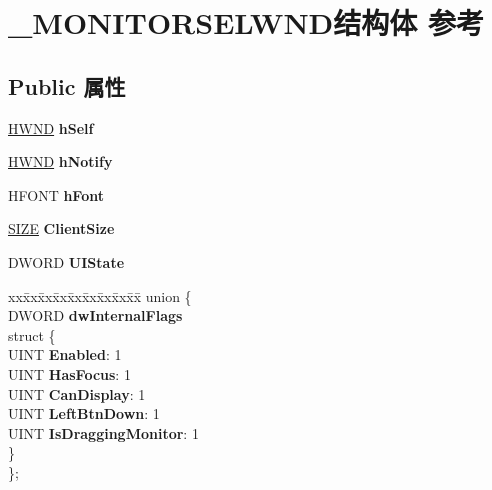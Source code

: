 \hypertarget{struct___m_o_n_i_t_o_r_s_e_l_w_n_d}{}\section{\+\_\+\+M\+O\+N\+I\+T\+O\+R\+S\+E\+L\+W\+N\+D结构体 参考}
\label{struct___m_o_n_i_t_o_r_s_e_l_w_n_d}
\subsection*{Public 属性}
\begin{DoxyCompactItemize}
\item 
\mbox{\label{struct___m_o_n_i_t_o_r_s_e_l_w_n_d_a94ce0356f7c895cdd30ce5c74a460bbb}} 
\hyperlink{interfacevoid}{H\+W\+ND} {\bfseries h\+Self}
\item 
\mbox{\label{struct___m_o_n_i_t_o_r_s_e_l_w_n_d_a95542c4089627031c88ba624ebb0a85b}} 
\hyperlink{interfacevoid}{H\+W\+ND} {\bfseries h\+Notify}
\item 
\mbox{\label{struct___m_o_n_i_t_o_r_s_e_l_w_n_d_a07cdd3f08ba2d3e9574987e960dda6b0}} 
H\+F\+O\+NT {\bfseries h\+Font}
\item 
\mbox{\label{struct___m_o_n_i_t_o_r_s_e_l_w_n_d_a02eb1195295c2920f7fe88c452e97849}} 
\hyperlink{structtag_s_i_z_e}{S\+I\+ZE} {\bfseries Client\+Size}
\item 
\mbox{\label{struct___m_o_n_i_t_o_r_s_e_l_w_n_d_ad8ac36f5f766e451e536a961613f24ff}} 
D\+W\+O\+RD {\bfseries U\+I\+State}
\item 
\mbox{\label{struct___m_o_n_i_t_o_r_s_e_l_w_n_d_a2396a5ae0038771a3e0e2eb4957bd48c}} 
\begin{tabbing}
xx\=xx\=xx\=xx\=xx\=xx\=xx\=xx\=xx\=\kill
union \{\\
\>DWORD {\bfseries dwInternalFlags}\\
\mbox{\label{union___m_o_n_i_t_o_r_s_e_l_w_n_d_1_1_0D200_af777f493a6643262c1216224a7665fc0}} 
\>struct \{\\
\>\>UINT {\bfseries Enabled}: 1\\
\>\>UINT {\bfseries HasFocus}: 1\\
\>\>UINT {\bfseries CanDisplay}: 1\\
\>\>UINT {\bfseries LeftBtnDown}: 1\\
\>\>UINT {\bfseries IsDraggingMonitor}: 1\\
\>\} \\
\}; \\


\end{tabbing}
\end{DoxyCompactItemize}
